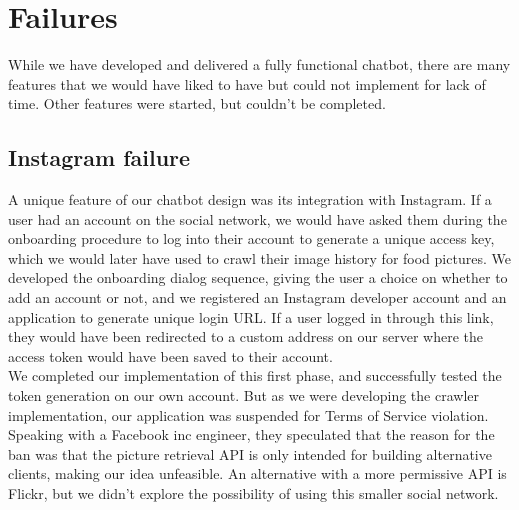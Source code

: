 \section{Failures}
While we have developed and delivered a fully functional chatbot, there are many features that we would have liked to have but could not implement for lack of time. Other features were started, but couldn't be completed.
\subsection*{Instagram failure}
A unique feature of our chatbot design was its integration with Instagram. If a user had an account on the social network, we would have asked them during the onboarding procedure to log into their account to generate a unique access key, which we would later have used to crawl their image history for food pictures.
We developed the onboarding dialog sequence, giving the user a choice on whether to add an account or not, and we registered an Instagram developer account and an application to generate unique login URL. If a user logged in through this link, they would have been redirected to a custom address on our server where the access token would have been saved to their account. \\
We completed our implementation of this first phase, and successfully tested the token generation on our own account. But as we were developing the crawler implementation, our application was suspended for Terms of Service violation. Speaking with a Facebook inc engineer, they speculated that the reason for the ban was that the picture retrieval API is only intended for building alternative clients, making our idea unfeasible. An alternative with a more permissive API is Flickr, but we didn't explore the possibility of using this smaller social network.
